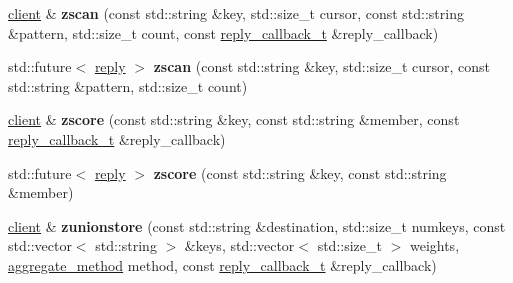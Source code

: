 \begin{DoxyCompactItemize}
\item 
\mbox{\label{classcpp__redis_1_1client_af9c9fd63e09c0dce9ee8a5a6263ac990}} 
\mbox{\hyperlink{classcpp__redis_1_1client}{client}} \& {\bfseries zscan} (const std\+::string \&key, std\+::size\+\_\+t cursor, const std\+::string \&pattern, std\+::size\+\_\+t count, const \mbox{\hyperlink{classcpp__redis_1_1client_af7a65eb21aa25230bfbb0b0203c4fc04}{reply\+\_\+callback\+\_\+t}} \&reply\+\_\+callback)
\item 
\mbox{\label{classcpp__redis_1_1client_a21a9678e93ec0ae43fd0079391696964}} 
std\+::future$<$ \mbox{\hyperlink{classcpp__redis_1_1reply}{reply}} $>$ {\bfseries zscan} (const std\+::string \&key, std\+::size\+\_\+t cursor, const std\+::string \&pattern, std\+::size\+\_\+t count)
\item 
\mbox{\label{classcpp__redis_1_1client_a5e0a18243dee60595c82fc4a630f6d86}} 
\mbox{\hyperlink{classcpp__redis_1_1client}{client}} \& {\bfseries zscore} (const std\+::string \&key, const std\+::string \&member, const \mbox{\hyperlink{classcpp__redis_1_1client_af7a65eb21aa25230bfbb0b0203c4fc04}{reply\+\_\+callback\+\_\+t}} \&reply\+\_\+callback)
\item 
\mbox{\label{classcpp__redis_1_1client_a72b20e861696db3e4dd5a4af96a1b427}} 
std\+::future$<$ \mbox{\hyperlink{classcpp__redis_1_1reply}{reply}} $>$ {\bfseries zscore} (const std\+::string \&key, const std\+::string \&member)
\item 
\mbox{\label{classcpp__redis_1_1client_ab63bc296d1365894caa956bda6540d55}} 
\mbox{\hyperlink{classcpp__redis_1_1client}{client}} \& {\bfseries zunionstore} (const std\+::string \&destination, std\+::size\+\_\+t numkeys, const std\+::vector$<$ std\+::string $>$ \&keys, std\+::vector$<$ std\+::size\+\_\+t $>$ weights, \mbox{\hyperlink{classcpp__redis_1_1client_aa197ca5b36da793c701d3ba388ec4946}{aggregate\+\_\+method}} method, const \mbox{\hyperlink{classcpp__redis_1_1client_af7a65eb21aa25230bfbb0b0203c4fc04}{reply\+\_\+callback\+\_\+t}} \&reply\+\_\+callback)
\item 
\mbox{\label{classcpp__redis_1_1client_af154add1984d81680ef6d40dd0a493d9}} 

\end{DoxyCompactItemize}
